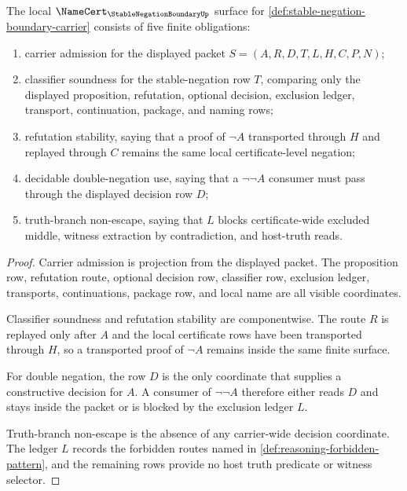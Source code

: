 \begin{theorem}
\label{thm:stable-negation-boundary-namecert-obligations}
The local $\NameCert_{\StableNegationBoundaryUp}$ surface for \autoref{def:stable-negation-boundary-carrier} consists of five finite obligations:
\begin{enumerate}
\item carrier admission for the displayed packet $S=(A,R,D,T,L,H,C,P,N)$;
\item classifier soundness for the stable-negation row $T$, comparing only the displayed proposition, refutation, optional decision, exclusion ledger, transport, continuation, package, and naming rows;
\item refutation stability, saying that a proof of $\neg A$ transported through $H$ and replayed through $C$ remains the same local certificate-level negation;
\item decidable double-negation use, saying that a $\neg\neg A$ consumer must pass through the displayed decision row $D$;
\item truth-branch non-escape, saying that $L$ blocks certificate-wide excluded middle, witness extraction by contradiction, and host-truth reads.
\end{enumerate}
\end{theorem}
\begin{proof}
Carrier admission is projection from the displayed packet. The proposition row, refutation route, optional decision row, classifier row, exclusion ledger, transports, continuations, package row, and local name are all visible coordinates.

Classifier soundness and refutation stability are componentwise. The route $R$ is replayed only after $A$ and the local certificate rows have been transported through $H$, so a transported proof of $\neg A$ remains inside the same finite surface.

For double negation, the row $D$ is the only coordinate that supplies a constructive decision for $A$. A consumer of $\neg\neg A$ therefore either reads $D$ and stays inside the packet or is blocked by the exclusion ledger $L$.

Truth-branch non-escape is the absence of any carrier-wide decision coordinate. The ledger $L$ records the forbidden routes named in \autoref{def:reasoning-forbidden-pattern}, and the remaining rows provide no host truth predicate or witness selector.
\end{proof}

